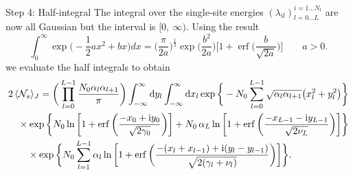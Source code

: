 \documentclass[8pt]{beamer}
\begin{document}
\begin{frame}[label={sec:org60631d9}]{Step 4: Half-integral}
The integral over the single-site energies \((\lambda_{il})_{l=0 \ldots L}^{i=1 \ldots N_{l}}\) are now all Gaussian but the interval is \([0,~\infty)\). Using the result
\[
\int_0^{\infty} \exp \bigg(-\frac{1}{2} a x^2+b x\bigg) d x=\bigg(\frac{\pi}{2 a}\bigg)^{\frac{1}{2}} \exp \bigg(\frac{b^2}{2 a}\bigg)\bigg[1+\operatorname{erf}\bigg(\frac{b}{\sqrt{2 a}}\bigg)\bigg] \qquad a > 0.
\]
we evaluate the half integrals to obtain
\begin{align*}
&2 \thinspace \langle \mathcal{N}_{s} \rangle_{J} = \bigg(\prod_{l=0}^{L-1} \frac{N_{0} \alpha_{l} \alpha_{l+1}}{\pi} \bigg) \int_{-\infty}^{\infty} \mathrm{d} y_{l} \int_{-\infty}^{\infty} \mathrm{d} x_{l} \exp \bigg\{- N_{0} \sum_{l=0}^{L-1} \sqrt{\alpha_{l} \alpha_{l+1}} \big( x_{l}^{2} + y_{l}^{2} \big)\bigg\} \\
&\quad \times \exp \bigg \{ N_{0} \ln \bigg [1 + \operatorname{erf} \bigg(\frac{- x_{0} + \mathrm{i} y_{0}}{\sqrt{2 \gamma_{0}}} \bigg) \bigg ] +  N_{0} \thinspace \alpha_{L} \ln \bigg [1 + \operatorname{erf} \bigg(\frac{- x_{L-1} - \mathrm{i} y_{L-1}}{\sqrt{2 \nu_{L}}} \bigg) \bigg ]  \bigg\} \\
&\quad \quad \times \exp \bigg \{ N_{0} \sum_{l=1}^{L-1} \alpha_{l} \ln \bigg [1 + \operatorname{erf} \bigg(\frac{- (x_{l} + x_{l-1}) + \mathrm{i} (y_{l} - y_{l-1})}{\sqrt{2 (\gamma_{l} + \nu_{l})}} \bigg) \bigg ]  \bigg\}.
\end{align*}
\end{frame}
\end{document}
